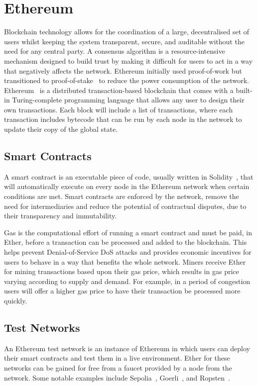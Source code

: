 
\section{Ethereum}

Blockchain technology allows for the coordination of a large, decentralised set of users whilst keeping the system transparent, secure, and auditable without the need for any central party. A consensus algorithm is a resource-intensive mechanism designed to build trust by making it difficult for users to act in a way that negatively affects the network. Ethereum initially used proof-of-work but transitioned to proof-of-stake~\cite{kapengut_event_2023} to reduce the power consumption of the network.
\x
Ethereum~\cite{vujicic_blockchain_2018,dannen_introducing_2017} is a distributed transaction-based blockchain that comes with a built-in Turing-complete programming language that allows any user to design their own transactions. Each block will include a list of transactions, where each transaction includes bytecode that can be run by each node in the network to update their copy of the global state.

\subsection*{Smart Contracts}

A smart contract is an executable piece of code, usually written in Solidity~\cite{noauthor_solidity_nodate}, that will automatically execute on every node in the Ethereum network when certain conditions are met. Smart contracts are enforced by the network, remove the need for intermediaries and reduce the potential of contractual disputes, due to their transparency and immutability.

\vspace{2mm}
\noindent
Gas is the computational effort of running a smart contract and must be paid, in Ether, before a transaction can be processed and added to the blockchain. This helps prevent Denial-of-Service DoS attacks and provides economic incentives for users to behave in a way that benefits the whole network.
\x
Miners receive Ether for mining transactions based upon their gas price, which results in gas price varying according to supply and demand. For example, in a period of congestion users will offer a higher gas price to have their transaction be processed more quickly.

\subsection*{Test Networks}

An Ethereum test network is an instance of Ethereum in which users can deploy their smart contracts and test them in a live environment. Ether for these networks can be gained for free from a faucet provided by a node from the network. Some notable examples include Sepolia~\cite{noauthor_sepolia_nodate}, Goerli~\cite{noauthor_goerli_nodate}, and Ropsten~\cite{noauthor_ropsten_2023}.